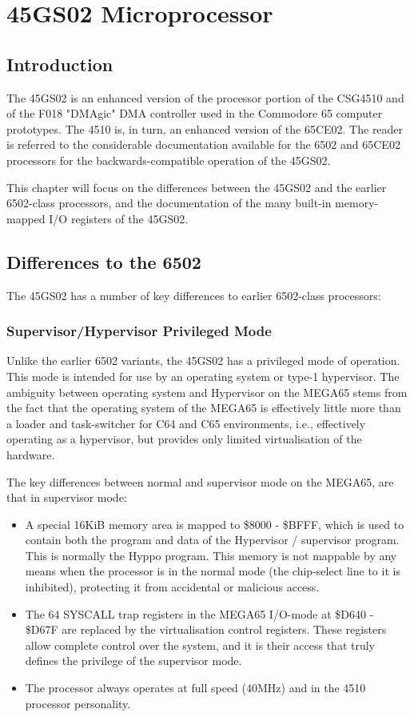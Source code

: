 \chapter{45GS02 Microprocessor}
\label{cha:cpu}
\label{cha:45gs02}
\section{Introduction}

The 45GS02 is an enhanced version of the processor portion of the CSG4510
and of the F018 "DMAgic" DMA controller used in the Commodore 65
computer prototypes.  The 4510 is, in turn,
an enhanced version of the 65CE02.
The reader is referred to
the considerable documentation available for the 6502 and 65CE02 processors
for the backwards-compatible operation of the 45GS02.

This chapter will
focus on the differences between the 45GS02 and the earlier 6502-class
processors, and the documentation of the many built-in memory-mapped I/O
registers of the 45GS02.

\section{Differences to the 6502}

The 45GS02 has a number of key differences to earlier 6502-class processors:

\subsection{Supervisor/Hypervisor Privileged Mode}

Unlike the earlier 6502 variants, the 45GS02 has a privileged mode of operation.
This mode is intended for use by an operating system or type-1
hypervisor.  The ambiguity between
operating system and Hypervisor on the MEGA65 stems from the fact that the operating
system of the MEGA65 is effectively little more than a loader and
task-switcher for C64 and C65
environments, i.e., effectively operating as a hypervisor, but provides
only limited virtualisation
of the hardware.

The key differences between normal and supervisor mode on the MEGA65, are that in
supervisor mode:

\begin{itemize}
\item A special 16KiB memory area is mapped to \$8000 - \$BFFF, which is
 used to contain both
 the program and data of the Hypervisor / supervisor program.
 This is normally the Hyppo program.
  This memory is not mappable by any means when the processor is in the
 normal mode (the chip-select
  line to it is inhibited), protecting it from accidental or malicious access.
\item The 64 SYSCALL trap registers in the MEGA65 I/O-mode at
\$D640 - \$D67F are replaced by the
  virtualisation control registers.  These registers allow complete
control over the system, and
  it is their access that truly defines the privilege of the supervisor mode.
  \item The processor always operates at full speed (40MHz) and in the
 4510 processor personality.
\end{itemize}

